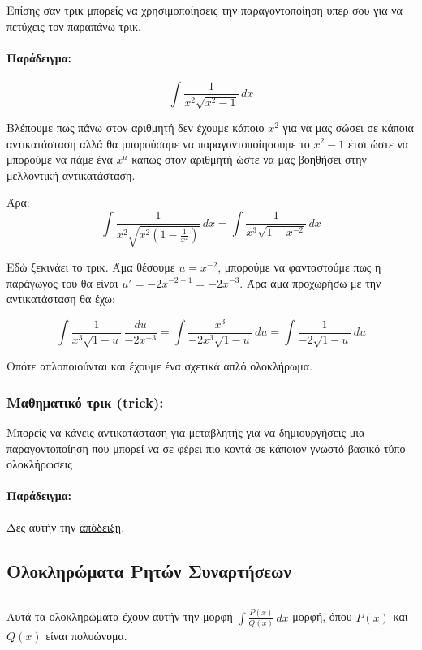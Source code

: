 \documentclass[a4paper,12pt]{article}
\begin{document}
Επίσης σαν τρικ μπορείς να χρησιμοποίησεις την παραγοντοποίηση υπερ σου για να πετύχεις τον παραπάνω τρικ.

\paragraph{Παράδειγμα:}
\[
\int \frac{1}{x^2\sqrt{x^2 - 1}}\,dx
\]

Βλέπουμε πως πάνω στον αριθμητή δεν έχουμε κάποιο $x^2$ για να μας σώσει σε κάποια αντικα\-τάσταση
αλλά θα μπορούσαμε να παραγοντοποίησουμε το $x^2-1$ έτσι ώστε να μπορούμε να πάμε ένα $x^a$ κάπως στον αριθμητή ώστε να μας βοηθήσει 
στην μελλοντική αντικατάσταση.

Άρα:
\[
\int \frac{1}{x^2\sqrt{x^2\left(1 - \frac{1}{x^2}\right)}}\,dx = \int \frac{1}{x^3\sqrt{1 - x^{-2}}}\,dx
\]

Εδώ ξεκινάει το τρικ. Άμα θέσουμε $u=x^{-2}$, μπορούμε να φανταστούμε πως η παράγωγος του θα είναι $u' = -2x^{-2 - 1} = -2x^{-3}$.
Άρα άμα προχωρήσω με την αντικατάσταση θα έχω:

\[
\int \frac{1}{x^3\sqrt{1 - u}}\,\frac{du}{-2x^{-3}} = \int \frac{x^3}{-2x^3\sqrt{1 - u}}\,du = \int \frac{1}{-2\sqrt{1 - u}}\,du
\]

Οπότε απλοποιούνται και έχουμε ένα σχετικά απλό ολοκλήρωμα.

\subsubsection*{Μαθηματικό τρικ (trick):}

Μπορείς να κάνεις αντικατάσταση για μεταβλητής για να δημιουργήσεις μια παραγοντοποίηση που μπορεί να σε φέρει πιο κοντά σε κάποιον
γνωστό βασικό τύπο ολοκλήρωσεις

\paragraph{Παράδειγμα:}
Δες αυτήν την \hyperlink{target_below}{απόδειξη}. 

\subsection*{Ολοκληρώματα Ρητών Συναρτήσεων}
\hrule
\vspace{0.5em}

Αυτά τα ολοκληρώματα έχουν αυτήν την μορφή $\int \frac{P(x)}{Q(x)}\,dx$ μορφή, όπου $P(x)$ και $Q(x)$ είναι πολυώνυμα.

\
\end{document}
